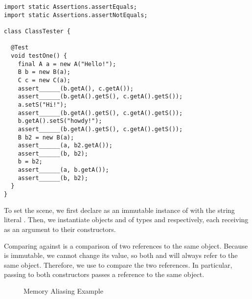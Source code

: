 \newpage %
\begin{lstlisting}[language=MyJava]
import static Assertions.assertEquals;
import static Assertions.assertNotEquals;

class ClassTester {

  @Test
  void testOne() {
    final A a = new A("Hello!");
    B b = new B(a);
    C c = new C(a);
    assert______(b.getA(), c.getA());
    assert______(b.getA().getS(), c.getA().getS());
    a.setS("Hi!");
    assert______(b.getA().getS(), c.getA().getS());
    b.getA().setS("howdy!");
    assert______(b.getA().getS(), c.getA().getS());
    B b2 = new B(a);
    assert______(a, b2.getA());
    assert______(b, b2);
    b = b2;
    assert______(a, b.getA());
    assert______(b, b2);
  }
}
\end{lstlisting}

To set the scene, we first declare  as an immutable instance of  with the string literal . 
Then, we instantiate objects  and  of types  and  respectively, each receiving  as an argument to their constructors. 

Comparing  against  is a comparison of two references to the same object. 
Because  is immutable, we cannot change its value, so both  and  will always refer to the same object. 
Therefore, we use  to compare the two references. 
In particular, passing  to both constructors passes a reference to the same object.

\begin{figure}[htp!]
\centering
{}
\caption{Memory Aliasing Example}
\label{fig:memoryref}
\end{figure}

